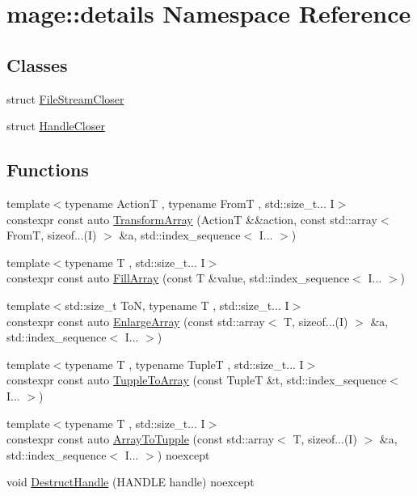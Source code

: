 \hypertarget{namespacemage_1_1details}{}\section{mage\+:\+:details Namespace Reference}
\label{namespacemage_1_1details}
\subsection*{Classes}
\begin{DoxyCompactItemize}
\item 
struct \mbox{\hyperlink{structmage_1_1details_1_1_file_stream_closer}{File\+Stream\+Closer}}
\item 
struct \mbox{\hyperlink{structmage_1_1details_1_1_handle_closer}{Handle\+Closer}}
\end{DoxyCompactItemize}
\subsection*{Functions}
\begin{DoxyCompactItemize}
\item 
{\footnotesize template$<$typename ActionT , typename FromT , std\+::size\+\_\+t... I$>$ }\\constexpr const auto \mbox{\hyperlink{namespacemage_1_1details_a597d1869ab9d86b34b67dc7d941dc5e5}{Transform\+Array}} (ActionT \&\&action, const std\+::array$<$ FromT, sizeof...(I) $>$ \&a, std\+::index\+\_\+sequence$<$ I... $>$)
\item 
{\footnotesize template$<$typename T , std\+::size\+\_\+t... I$>$ }\\constexpr const auto \mbox{\hyperlink{namespacemage_1_1details_ae5b148b74b882be8b1afd09832808a67}{Fill\+Array}} (const T \&value, std\+::index\+\_\+sequence$<$ I... $>$)
\item 
{\footnotesize template$<$std\+::size\+\_\+t ToN, typename T , std\+::size\+\_\+t... I$>$ }\\constexpr const auto \mbox{\hyperlink{namespacemage_1_1details_af8daa2a877610f68e45c4ac35c69dc06}{Enlarge\+Array}} (const std\+::array$<$ T, sizeof...(I) $>$ \&a, std\+::index\+\_\+sequence$<$ I... $>$)
\item 
{\footnotesize template$<$typename T , typename TupleT , std\+::size\+\_\+t... I$>$ }\\constexpr const auto \mbox{\hyperlink{namespacemage_1_1details_a32537621c79324893f0671ae2124a365}{Tupple\+To\+Array}} (const TupleT \&t, std\+::index\+\_\+sequence$<$ I... $>$)
\item 
{\footnotesize template$<$typename T , std\+::size\+\_\+t... I$>$ }\\constexpr const auto \mbox{\hyperlink{namespacemage_1_1details_a282e14de1d24b9f356912f8ac3bb868d}{Array\+To\+Tupple}} (const std\+::array$<$ T, sizeof...(I) $>$ \&a, std\+::index\+\_\+sequence$<$ I... $>$) noexcept
\item 
void \mbox{\hyperlink{namespacemage_1_1details_a213580128442b2980ad4c3c82bf80ee8}{Destruct\+Handle}} (H\+A\+N\+D\+LE handle) noexcept
\end{DoxyCompactItemize}


